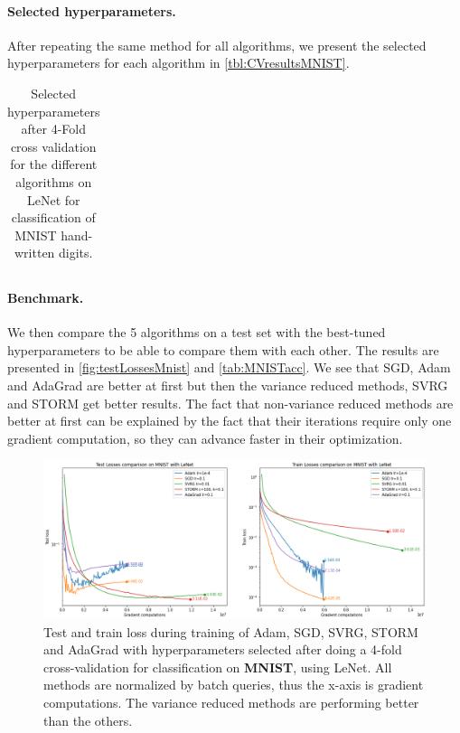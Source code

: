\documentclass[a4paper,11pt,oneside]{report}
\begin{document}
\paragraph{Selected hyperparameters.}
After repeating the same method for all algorithms, we present the selected hyperparameters for each algorithm in \autoref{tbl:CVresultsMNIST}.

\begin{table}
    \begin{center}
        \begin{tabular}{||c | c | l||}
             \hline
             
        \end{tabular}
    \end{center}
    \caption{Selected hyperparameters after 4-Fold cross validation for the different algorithms on LeNet for classification of MNIST hand-written digits.
    }
    \label{tbl:CVresultsMNIST}
\end{table}

\paragraph{Benchmark.}
We then compare the 5 algorithms on a test set with the best-tuned hyperparameters to be able to compare them with each other. The results are presented in \autoref{fig:testLossesMnist} and \autoref{tab:MNISTacc}. We see that SGD, Adam and AdaGrad are better at first but then the variance reduced methods, SVRG and STORM get better results. The fact that non-variance reduced methods are better at first can be explained by the fact that their iterations require only one gradient computation, so they can advance faster in their optimization.

\begin{figure}[h]
    \centering
    \includegraphics[width=\columnwidth]{report/figures/MNIST.png}
    \caption{Test and train loss during training of Adam, SGD, SVRG, STORM and AdaGrad with hyperparameters selected after doing a 4-fold cross-validation for classification on \textbf{MNIST}, using LeNet. All methods are normalized by batch queries, thus the x-axis is gradient computations. The variance reduced methods are performing better than the others.}
    \label{fig:testLossesMnist}
\end{figure}
\end{document}
